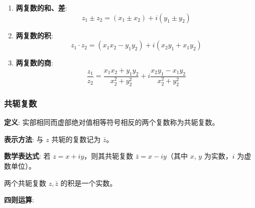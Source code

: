 \begin{enumerate}
\item \textbf{两复数的和、差}:
\begin{equation*}
z_{1} \pm z_{2} = (x_{1} \pm x_{2}) + i(y_{1} \pm y_{2})
\end{equation*}
\item \textbf{两复数的积}:
\begin{equation*}
z_{1} \cdot z_{2} = (x_{1}x_{2} - y_{1}y_{2}) + i(x_{2}y_{1} + x_{1}y_{2})
\end{equation*}
\item \textbf{两复数的商}:
\begin{equation*}
\frac{z_{1}}{z_{2}} = \frac{x_{1}x_{2} + y_{1}y_{2}}{x_{2}^{2} + y_{2}^{2}} + i\frac{x_{2}y_{1} - x_{1}y_{2}}{x_{2}^{2} + y_{2}^{2}}
\end{equation*}
\end{enumerate}
\subsubsection{共轭复数}
\label{共轭复数}
\textbf{定义}: 实部相同而虚部绝对值相等符号相反的两个复数称为共轭复数。

\textbf{表示方法}: 与 \(z\) 共轭的复数记为 \(\bar{z}\)。

\textbf{数学表达式}:  若 \(z = x + iy\)，则其共轭复数
\(\bar{z} = x - iy\)（其中 \(x\), \(y\) 为实数，\(i\) 为虚数单位）。

\begin{tcolorbox}[title={Note},colback=red!5!white
,colframe=red!75!black
,colbacktitle=yellow!50!red
,coltitle=red!25!black, fonttitle=\bfseries,subtitle style={boxrule=0.4pt, colback=yellow!50!red!25!white}]
两个共轭复数 \(z,\bar{z}\) 的积是一个实数。

\end{tcolorbox}

\textbf{四则运算}:

